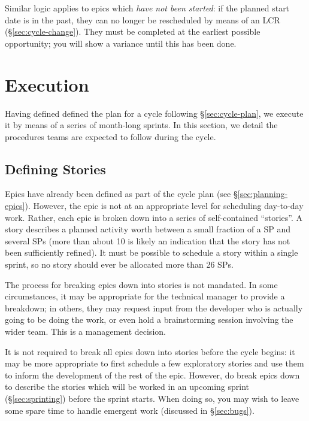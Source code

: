Similar logic applies to epics which \emph{have not been started}: if
the planned start date is in the past, they can no longer be rescheduled
by means of an LCR (\S\ref{sec:cycle-change}). They must
be completed at the earliest possible opportunity; you will show a
variance until this has been done.

\section{Execution}\label{execution}

Having defined defined the plan for a cycle following \S\ref{sec:cycle-plan}, we execute it by means of a series of month-long sprints.
In this section, we detail the procedures teams are expected to follow during the cycle.

\subsection{Defining Stories}
\label{sec:defining-stories}

Epics have already been defined
as part of the cycle plan (see \S\ref{sec:planning-epics}). However, the epic is not at an appropriate
level for scheduling day-to-day work. Rather, each epic is broken down
into a series of self-contained ``stories''. A story describes a planned
activity worth between a small fraction of a SP and several SPs (more
than about 10 is likely an indication that the story has not been
sufficiently refined). It must be possible to schedule a story within a
single sprint, so no story should ever be allocated more than 26 SPs.

The process for breaking epics down into stories is not mandated. In
some circumstances, it may be appropriate for the technical manager to
provide a breakdown; in others, they may request input from the
developer who is actually going to be doing the work, or even hold a
brainstorming session involving the wider team. This is a management
decision.

It is not required to break all epics down into stories before the cycle
begins: it may be more appropriate to first schedule a few exploratory
stories and use them to inform the development of the rest of the epic.
However, do break epics down to describe the stories which will be
worked in an
upcoming sprint (\S\ref{sec:sprinting}) before the sprint
starts. When doing so, you may wish to leave some spare time to handle
emergent work (discussed in \S\ref{sec:bugs}).

